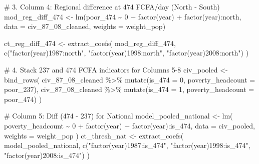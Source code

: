 \documentclass[
  letterpaper,
  DIV=11,
  numbers=noendperiod]{scrartcl}
\newenvironment{Shaded}{\begin{snugshade}}{\end{snugshade}}
\newcommand{\AttributeTok}[1]{\textcolor[rgb]{0.40,0.45,0.13}{#1}}
\newcommand{\CommentTok}[1]{\textcolor[rgb]{0.37,0.37,0.37}{#1}}
\newcommand{\DecValTok}[1]{\textcolor[rgb]{0.68,0.00,0.00}{#1}}
\newcommand{\FunctionTok}[1]{\textcolor[rgb]{0.28,0.35,0.67}{#1}}
\newcommand{\NormalTok}[1]{\textcolor[rgb]{0.00,0.23,0.31}{#1}}
\newcommand{\OtherTok}[1]{\textcolor[rgb]{0.00,0.23,0.31}{#1}}
\newcommand{\SpecialCharTok}[1]{\textcolor[rgb]{0.37,0.37,0.37}{#1}}
\newcommand{\StringTok}[1]{\textcolor[rgb]{0.13,0.47,0.30}{#1}}
\begin{document}
\begin{Shaded}
\begin{Highlighting}[]
\CommentTok{\# 3. Column 4: Regional difference at 474 FCFA/day (North {-} South)}
\NormalTok{mod\_reg\_diff\_474 }\OtherTok{\textless{}{-}} \FunctionTok{lm}\NormalTok{(poor\_474 }\SpecialCharTok{\textasciitilde{}} \DecValTok{0} \SpecialCharTok{+} \FunctionTok{factor}\NormalTok{(year) }\SpecialCharTok{+} \FunctionTok{factor}\NormalTok{(year)}\SpecialCharTok{:}\NormalTok{north,}
                       \AttributeTok{data =}\NormalTok{ civ\_87\_08\_cleaned, }\AttributeTok{weights =}\NormalTok{ weight\_pop)}

\NormalTok{ct\_reg\_diff\_474 }\OtherTok{\textless{}{-}} \FunctionTok{extract\_coefs}\NormalTok{(}
\NormalTok{  mod\_reg\_diff\_474,}
  \FunctionTok{c}\NormalTok{(}\StringTok{"factor(year)1987:north"}\NormalTok{, }\StringTok{"factor(year)1998:north"}\NormalTok{, }\StringTok{"factor(year)2008:north"}\NormalTok{)}
\NormalTok{)}

\CommentTok{\# 4. Stack 237 and 474 FCFA indicators for Columns 5{-}8}
\NormalTok{civ\_pooled }\OtherTok{\textless{}{-}} \FunctionTok{bind\_rows}\NormalTok{(}
\NormalTok{  civ\_87\_08\_cleaned }\SpecialCharTok{\%\textgreater{}\%} \FunctionTok{mutate}\NormalTok{(}\AttributeTok{is\_474 =} \DecValTok{0}\NormalTok{, }\AttributeTok{poverty\_headcount =}\NormalTok{ poor\_237),}
\NormalTok{  civ\_87\_08\_cleaned }\SpecialCharTok{\%\textgreater{}\%} \FunctionTok{mutate}\NormalTok{(}\AttributeTok{is\_474 =} \DecValTok{1}\NormalTok{, }\AttributeTok{poverty\_headcount =}\NormalTok{ poor\_474)}
\NormalTok{)}

\CommentTok{\# Column 5: Diff (474 {-} 237) for National}
\NormalTok{model\_pooled\_national }\OtherTok{\textless{}{-}} \FunctionTok{lm}\NormalTok{(}
\NormalTok{  poverty\_headcount }\SpecialCharTok{\textasciitilde{}} \DecValTok{0} \SpecialCharTok{+} \FunctionTok{factor}\NormalTok{(year) }\SpecialCharTok{+} \FunctionTok{factor}\NormalTok{(year)}\SpecialCharTok{:}\NormalTok{is\_474,}
  \AttributeTok{data =}\NormalTok{ civ\_pooled, }\AttributeTok{weights =}\NormalTok{ weight\_pop}
\NormalTok{)}
\NormalTok{ct\_thresh\_nat }\OtherTok{\textless{}{-}} \FunctionTok{extract\_coefs}\NormalTok{(}
\NormalTok{  model\_pooled\_national,}
  \FunctionTok{c}\NormalTok{(}\StringTok{"factor(year)1987:is\_474"}\NormalTok{, }\StringTok{"factor(year)1998:is\_474"}\NormalTok{, }\StringTok{"factor(year)2008:is\_474"}\NormalTok{)}
\NormalTok{)}


\end{Highlighting}
\end{Shaded}
\end{document}

